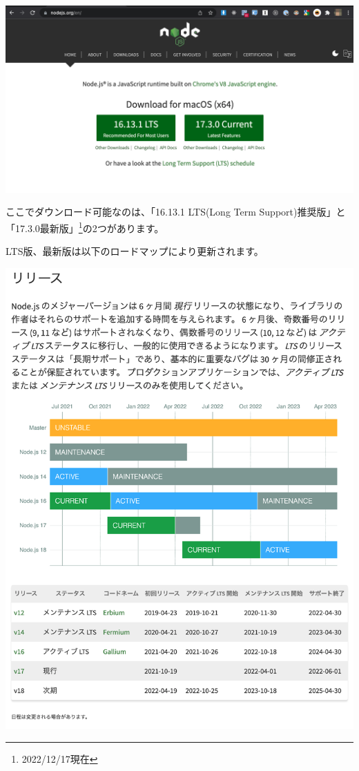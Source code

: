 \begin{reviewimage}[H]%
\includegraphics[width=1.0\maxwidth]{./images/01-createDevEnv/01_01nodejsTop.png}%
\label{image:01-createDevEnv:01_01nodejsTop}
\end{reviewimage}

ここでダウンロード可能なのは、「16.13.1 LTS(Long Term Support)推奨版」と「17.3.0最新版」\footnote{2022/12/17現在}の2つがあります。

LTS版、最新版は以下のロードマップにより更新されます。

\begin{reviewimage}[H]%
\includegraphics[width=1.0\maxwidth]{./images/01-createDevEnv/01_02nodejsRoadmap.png}%
\label{image:01-createDevEnv:01_02nodejsRoadmap}
\end{reviewimage}

